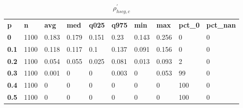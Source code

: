 \begin{table}[h]
 \centering 
\footnotesize
\caption{$\rho_{hscg,c}^\prime $}
\label{tab:alphahscgc}
\begin{tabular}[h]{| l l l l l l l l l l|
    } \hline
\textbf{ p} & \textbf{ n} & \textbf{ avg} & \textbf{ med} & \textbf{ q025} & \textbf{ q975} & \textbf{ min} & \textbf{ max} & \textbf{ pct\_0} & \textbf{ pct\_nan}
           \\
  \textbf{  0} & 1100 & 0.183 & 0.179 & 0.151 &  0.23 & 0.143 & 0.256 &   0 & 0
           \\
  \textbf{0.1} & 1100 & 0.118 & 0.117 &   0.1 & 0.137 & 0.091 & 0.156 &   0 & 0
           \\
  \textbf{0.2} & 1100 & 0.054 & 0.055 & 0.025 & 0.081 & 0.013 & 0.093 &   2 & 0
           \\
  \textbf{0.3} & 1100 & 0.001 &     0 &     0 & 0.003 &     0 & 0.053 &  99 & 0
           \\
  \textbf{0.4} & 1100 &     0 &     0 &     0 &     0 &     0 &     0 & 100 & 0
           \\
  \textbf{0.5} & 1100 &     0 &     0 &     0 &     0 &     0 &     0 & 100 & 0
           \\
 \hline \end{tabular}
 \end{table}
